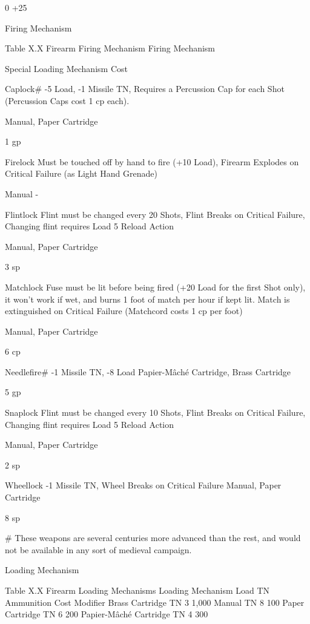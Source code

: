 \documentclass[oneside,11pt,english]{book}
\begin{document}
0 +25%


 
Firing Mechanism 

 
Table X.X Firearm Firing Mechanism 
Firing 
Mechanism 

Special Loading Mechanism Cost 

Caplock\# -5 Load, -1 Missile TN, Requires a Percussion Cap for each Shot (Percussion 
Caps cost 1 cp each). 

Manual, Paper 
Cartridge 

1 gp 

Firelock Must be touched off by hand to fire (+10 Load), Firearm Explodes on Critical 
Failure (as Light Hand Grenade) 

Manual - 

Flintlock Flint must be changed every 20 Shots, Flint Breaks on Critical Failure, 
Changing flint requires Load 5 Reload Action 

Manual, Paper 
Cartridge 

3 sp 

Matchlock Fuse must be lit before being fired (+20 Load for the first Shot only), it won’t 
work if wet, and burns 1 foot of match per hour if kept lit. Match is 
extinguished on Critical Failure (Matchcord costs 1 cp per foot) 

Manual, Paper 
Cartridge 

6 cp 

Needlefire\# -1 Missile TN, -8 Load Papier-Mâché 
Cartridge, Brass 
Cartridge 

5 gp 

Snaplock Flint must be changed every 10 Shots, Flint Breaks on Critical Failure, 
Changing flint requires Load 5 Reload Action 

Manual, Paper 
Cartridge 

2 sp 

Wheellock -1 Missile TN, Wheel Breaks on Critical Failure Manual, Paper 
Cartridge 

8 sp 

\# These weapons are several centuries more advanced than the rest, and would not be available in any sort of medieval campaign. 

 

Loading Mechanism 

 
Table X.X Firearm Loading Mechanisms 
Loading Mechanism Load TN Ammunition Cost Modifier 
Brass Cartridge TN 3 1,000%
Manual TN 8 100%
Paper Cartridge TN 6 200%
Papier-Mâché Cartridge TN 4 300%
\end{document}
